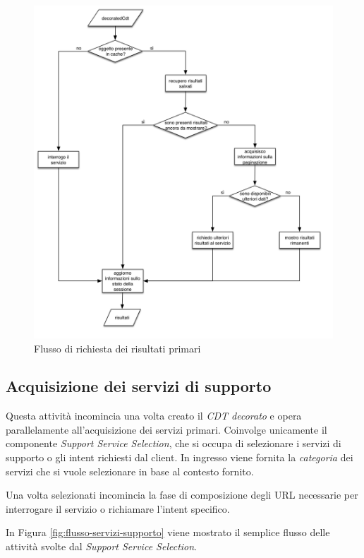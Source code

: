 \begin{figure}[ht]
	\centering
	\includegraphics[width=\textwidth]{5-implementazione-backend/Immagini/diagramma_flusso_servizi_primari.png}
	\caption{Flusso di richiesta dei risultati primari\label{fig:flusso-servizi-primari}}
\end{figure}

\subsection*{Acquisizione dei servizi di supporto}

Questa attività incomincia una volta creato il \emph{CDT decorato} e opera parallelamente all'acquisizione dei servizi primari. Coinvolge unicamente il componente \emph{Support Service Selection}, che si occupa di selezionare i servizi di supporto o gli intent richiesti dal client. In ingresso viene fornita la \emph{categoria} dei servizi che si vuole selezionare in base al contesto fornito.

Una volta selezionati incomincia la fase di composizione degli URL necessarie per interrogare il servizio o richiamare l'intent specifico.

In Figura \ref{fig:flusso-servizi-supporto} viene mostrato il semplice flusso delle attività svolte dal \emph{Support Service Selection}.
	
